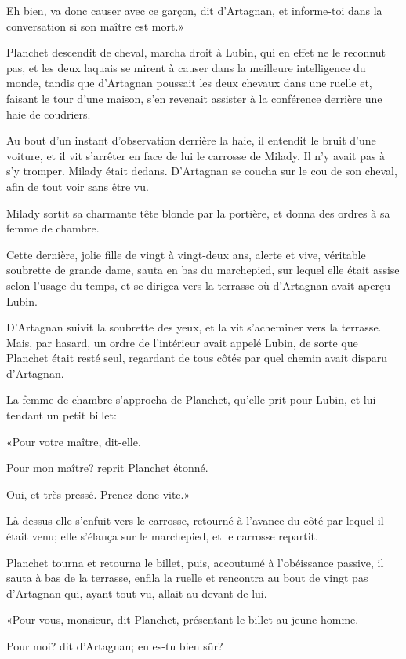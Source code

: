 \speak  Eh bien, va donc causer avec ce garçon, dit d'Artagnan, et informe-toi dans la conversation si son maître est mort.» 

Planchet descendit de cheval, marcha droit à Lubin, qui en effet ne le reconnut pas, et les deux laquais se mirent à causer dans la meilleure intelligence du monde, tandis que d'Artagnan poussait les deux chevaux dans une ruelle et, faisant le tour d'une maison, s'en revenait assister à la conférence derrière une haie de coudriers. 

Au bout d'un instant d'observation derrière la haie, il entendit le bruit d'une voiture, et il vit s'arrêter en face de lui le carrosse de Milady. Il n'y avait pas à s'y tromper. Milady était dedans. D'Artagnan se coucha sur le cou de son cheval, afin de tout voir sans être vu. 

Milady sortit sa charmante tête blonde par la portière, et donna des ordres à sa femme de chambre. 

Cette dernière, jolie fille de vingt à vingt-deux ans, alerte et vive, véritable soubrette de grande dame, sauta en bas du marchepied, sur lequel elle était assise selon l'usage du temps, et se dirigea vers la terrasse où d'Artagnan avait aperçu Lubin. 

D'Artagnan suivit la soubrette des yeux, et la vit s'acheminer vers la terrasse. Mais, par hasard, un ordre de l'intérieur avait appelé Lubin, de sorte que Planchet était resté seul, regardant de tous côtés par quel chemin avait disparu d'Artagnan. 

La femme de chambre s'approcha de Planchet, qu'elle prit pour Lubin, et lui tendant un petit billet: 

«Pour votre maître, dit-elle. 

\speak  Pour mon maître? reprit Planchet étonné. 

\speak  Oui, et très pressé. Prenez donc vite.» 

Là-dessus elle s'enfuit vers le carrosse, retourné à l'avance du côté par lequel il était venu; elle s'élança sur le marchepied, et le carrosse repartit. 

Planchet tourna et retourna le billet, puis, accoutumé à l'obéissance passive, il sauta à bas de la terrasse, enfila la ruelle et rencontra au bout de vingt pas d'Artagnan qui, ayant tout vu, allait au-devant de lui. 

«Pour vous, monsieur, dit Planchet, présentant le billet au jeune homme. 

\speak  Pour moi? dit d'Artagnan; en es-tu bien sûr? 

